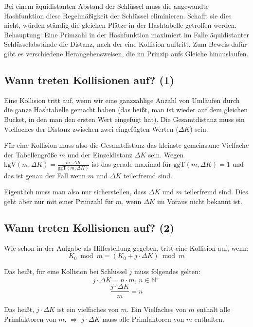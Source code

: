 \begin{solution}
Bei einem äquidistanten Abstand der Schlüssel muss die angewandte Hashfunktion diese Regelmäßigkeit der Schlüssel eliminieren. Schafft sie dies nicht, würden ständig die gleichen Plätze in der Hashtabelle getroffen werden.
Behauptung: Eine Primzahl in der Hashfunktion maximiert im Falle äquidistanter Schlüsselabstände die Distanz, nach der eine Kollision auftritt.
Zum Beweis dafür gibt es verschiedene Herangehensweisen, die im Prinzip aufs Gleiche hinauslaufen.


\subsection{\color{solutioncolor}Wann treten Kollisionen auf? (1)}

Eine Kollision tritt auf, wenn wir eine ganzzahlige Anzahl von Umläufen durch die ganze Hashtabelle gemacht haben (das heißt, man ist wieder auf dem gleichen Bucket, in den man den ersten Wert eingefügt hat).
Die Gesamtdistanz muss ein Vielfaches der Distanz zwischen zwei eingefügten Werten ($\Delta K$) sein.

Für eine Kollision muss also die Gesamtdistanz das kleinste gemeinsame Vielfache der Tabellengröße $m$ und der Einzeldistanz $\Delta K$ sein.
Wegen $\mathrm{kgV}(m,\Delta K) = \frac{m \cdot \Delta K}{\mathrm{ggT}(m,\Delta K)}$ ist das gerade maximal für $\mathrm{ggT}(m,\Delta K)=1$ und das ist genau der Fall wenn $m$ und $\Delta K$ teilerfremd sind.

Eigentlich muss man also nur sicherstellen, dass $\Delta K$ und $m$ teilerfremd sind. Dies geht aber nur mit einer Primzahl für $m$, wenn $\Delta K$ im Voraus nicht bekannt ist.


\subsection{\color{solutioncolor}Wann treten Kollisionen auf? (2)}

Wie schon in der Aufgabe als Hilfestellung gegeben, tritt eine Kollision auf, wenn:
\[K_{0} \bmod m = (K_{0} + j \cdot \Delta K) \bmod m\]

Das heißt, für eine Kollision bei Schlüssel $j$ muss folgendes gelten:
\[j \cdot \Delta K = n \cdot m,\, n \in \mathbb{N}^+ \]
\[\frac{j \cdot \Delta K}{m} = n\]

Das heißt, $j \cdot \Delta K$ ist ein vielfaches von $m$. Ein Vielfaches von $m$ enthält alle Primfaktoren von $m$. $\Rightarrow$ $j \cdot \Delta K$ muss alle Primfaktoren von $m$ enthalten.


\end{solution}
